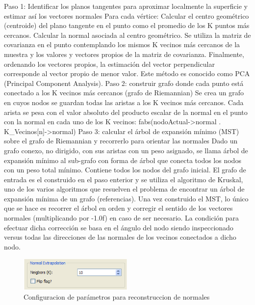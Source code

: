 Paso 1: Identificar los planos tangentes para aproximar localmente la superficie y estimar así los vectores normales
   Para cada vértice:
Calcular el centro geométrico (centroide) del plano tangente en el punto como el promedio de los K puntos más cercanos.
Calcular la normal asociada al centro geométrico. Se utiliza la matriz de covarianza en el punto contemplando los mismos K vecinos más cercanos de la muestra y los valores y vectores propios de la matriz de covarianza. Finalmente, ordenando los vectores propios, la estimación del vector perpendicular corresponde al vector propio de menor valor. Este método es conocido como PCA (Principal Component Analysis).
Paso 2: construir grafo donde cada punto está conectado a los K vecinos más cercanos (grafo de Riemannian)
   Se crea un grafo en cuyos nodos se guardan todas las aristas a los K vecinos más cercanos. Cada arista se pesa con el valor absoluto del producto escalar de la normal en el punto con la normal en cada uno de los K vecinos:
   fabs(nodoActual->normal . K_Vecinos[n]->normal)
Paso 3: calcular el árbol de expansión mínimo (MST) sobre el grafo de Riemannian y recorrerlo para orientar las normales
Dado un grafo conexo, no dirigido, con sus aristas con un peso asignado, se llama árbol de expansión mínimo al sub-grafo con forma de árbol que conecta todos los nodos con un peso total mínimo. Contiene todos los nodos del grafo inicial. El grafo de entrada es el construido en el paso enterior y se utiliza el algoritmo de Kruskal, uno de los varios algoritmos que resuelven el problema de encontrar un árbol de expansión mínima de un grafo (referencias).
Una vez construido el MST, lo único que se hace es recorrer el árbol en orden y corregir el sentido de los vectores normales (multiplicando por -1.0f) en caso de ser necesario. La condición para efectuar dicha corrección se basa en el ángulo del nodo siendo inspeccionado versus todas las direcciones de las normales de los vecinos conectados a dicho nodo.

\begin{figure}[H]
  \centering
    \includegraphics[width=0.5\textwidth]{./Cap6_reconstruccion/malla-normalextrapolation.png}
  \caption{Configuracion de parámetros para reconstruccion de normales}
  \label{fig:Mesh-Normals}
\end{figure}

